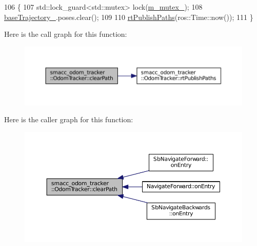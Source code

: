 \begin{DoxyCode}
106 \{
107     std::lock\_guard<std::mutex> lock(\hyperlink{classsmacc__odom__tracker_1_1OdomTracker_ad65e52bfd236e073940808c35f2bed8c}{m\_mutex\_});
108     \hyperlink{classsmacc__odom__tracker_1_1OdomTracker_ac3a17be46ab833632c5f63e75c840dc7}{baseTrajectory\_}.poses.clear();
109 
110     \hyperlink{classsmacc__odom__tracker_1_1OdomTracker_a8c9144a9d8b9ede7f45d06492496564c}{rtPublishPaths}(ros::Time::now());
111 \}
\end{DoxyCode}


Here is the call graph for this function\+:
\nopagebreak
\begin{figure}[H]
\begin{center}
\leavevmode
\includegraphics[width=350pt]{classsmacc__odom__tracker_1_1OdomTracker_a81ef228f0c2659e1bf9f8fdcb03fc7ae_cgraph}
\end{center}
\end{figure}




Here is the caller graph for this function\+:
\nopagebreak
\begin{figure}[H]
\begin{center}
\leavevmode
\includegraphics[width=350pt]{classsmacc__odom__tracker_1_1OdomTracker_a81ef228f0c2659e1bf9f8fdcb03fc7ae_icgraph}
\end{center}
\end{figure}


